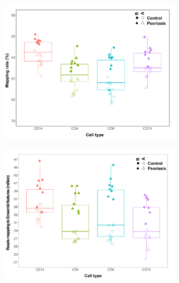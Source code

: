 \begin{figure}[htbp]
\centering
\begin{subfigure}{0.5\textwidth}
\centering
\includegraphics[width=\textwidth]{./Results2/pdfs/PS_CTL_RNAseq_uniquely_mapped_reads_rate_cell_type_batch_and_condition_boxplots}
\caption{\textbf{}}
\end{subfigure}%
\begin{subfigure}{0.5\textwidth}
\centering
\includegraphics[width=\textwidth]{./Results2/pdfs/PS_CTL_RNAseq_total_reads_per_batch_cell_type_and_condition}
\caption{\textbf{}}
\end{subfigure}

\end{figure}
